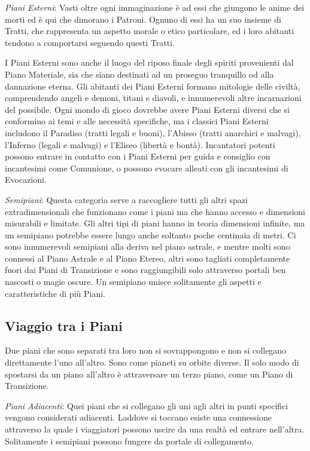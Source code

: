 \documentclass[a4paper,twoside,openany]{book}
\begin{document}
\begin{multicols}{2}

\emph{Piani Esterni}: Vasti oltre ogni immaginazione è ad essi che giungono le anime dei morti ed è qui che dimorano i Patroni. Ognuno di essi ha un suo insieme di Tratti, che rappresenta un aspetto morale o etico particolare, ed i loro abitanti tendono a comportarsi seguendo questi Tratti.

I Piani Esterni sono anche il luogo del riposo finale degli spiriti provenienti dal Piano Materiale, sia che siano destinati ad un proseguo tranquillo od alla dannazione eterna. Gli abitanti dei Piani Esterni formano mitologie delle civiltà, comprendendo angeli e demoni, titani e diavoli, e innumerevoli altre incarnazioni del possibile. Ogni mondo di gioco dovrebbe avere Piani Esterni diversi che si conformino ai temi e alle necessità specifiche, ma i classici Piani Esterni includono il Paradiso (tratti legali e buoni), l'Abisso (tratti anarchici e malvagi), l'Inferno (legali e malvagi) e l'Eliseo (libertà e bontà). Incantatori potenti possono entrare in contatto con i Piani Esterni per guida e consiglio con incantesimi come Comunione, o possono evocare alleati con gli incantesimi di Evocazioni.

\emph{Semipiani}: Questa categoria serve a raccogliere tutti gli altri spazi extradimensionali che funzionano come i piani ma che hanno accesso e dimensioni misurabili e limitate. Gli altri tipi di piani hanno in teoria dimensioni infinite, ma un semipiano potrebbe essere lungo anche soltanto poche centinaia di metri. Ci sono innumerevoli semipiani alla deriva nel piano astrale, e mentre molti sono connessi al Piano Astrale e al Piano Etereo, altri sono tagliati completamente fuori dai Piani di Transizione e sono raggiungibili solo attraverso portali ben nascosti o magie oscure. Un semipiano unisce solitamente gli aspetti e caratteristiche di più Piani.

\subsection{Viaggio tra i Piani}
Due piani che sono separati tra loro non si sovrappongono e non si collegano direttamente l'uno all'altro. Sono come pianeti su orbite diverse. Il solo modo di spostarsi da un piano all'altro è attraversare un terzo piano, come un Piano di Transizione.

\emph{Piani Adiacenti}: Quei piani che si collegano gli uni agli altri in punti specifici vengono considerati adiacenti. Laddove si toccano esiste una connessione attraverso la quale i viaggiatori possono uscire da una realtà ed entrare nell'altra. Solitamente i semipiani possono fungere da portale di collegamento.


\end{multicols}
\end{document}
